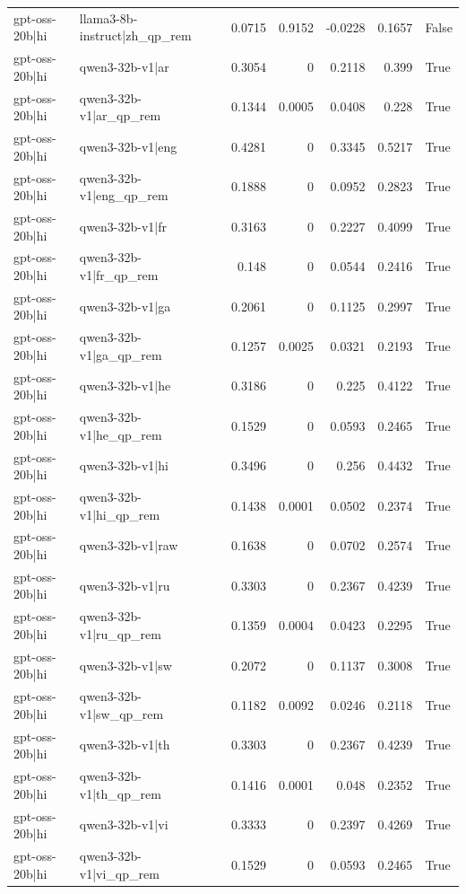 \begin{table}
\begin{tabular}{l l r r r r l}
gpt-oss-20b|hi & llama3-8b-instruct|zh_qp_rem & 0.0715 & 0.9152 & -0.0228 & 0.1657 & False \\
gpt-oss-20b|hi & qwen3-32b-v1|ar & 0.3054 & 0 & 0.2118 & 0.399 & True \\
gpt-oss-20b|hi & qwen3-32b-v1|ar_qp_rem & 0.1344 & 0.0005 & 0.0408 & 0.228 & True \\
gpt-oss-20b|hi & qwen3-32b-v1|eng & 0.4281 & 0 & 0.3345 & 0.5217 & True \\
gpt-oss-20b|hi & qwen3-32b-v1|eng_qp_rem & 0.1888 & 0 & 0.0952 & 0.2823 & True \\
gpt-oss-20b|hi & qwen3-32b-v1|fr & 0.3163 & 0 & 0.2227 & 0.4099 & True \\
gpt-oss-20b|hi & qwen3-32b-v1|fr_qp_rem & 0.148 & 0 & 0.0544 & 0.2416 & True \\
gpt-oss-20b|hi & qwen3-32b-v1|ga & 0.2061 & 0 & 0.1125 & 0.2997 & True \\
gpt-oss-20b|hi & qwen3-32b-v1|ga_qp_rem & 0.1257 & 0.0025 & 0.0321 & 0.2193 & True \\
gpt-oss-20b|hi & qwen3-32b-v1|he & 0.3186 & 0 & 0.225 & 0.4122 & True \\
gpt-oss-20b|hi & qwen3-32b-v1|he_qp_rem & 0.1529 & 0 & 0.0593 & 0.2465 & True \\
gpt-oss-20b|hi & qwen3-32b-v1|hi & 0.3496 & 0 & 0.256 & 0.4432 & True \\
gpt-oss-20b|hi & qwen3-32b-v1|hi_qp_rem & 0.1438 & 0.0001 & 0.0502 & 0.2374 & True \\
gpt-oss-20b|hi & qwen3-32b-v1|raw & 0.1638 & 0 & 0.0702 & 0.2574 & True \\
gpt-oss-20b|hi & qwen3-32b-v1|ru & 0.3303 & 0 & 0.2367 & 0.4239 & True \\
gpt-oss-20b|hi & qwen3-32b-v1|ru_qp_rem & 0.1359 & 0.0004 & 0.0423 & 0.2295 & True \\
gpt-oss-20b|hi & qwen3-32b-v1|sw & 0.2072 & 0 & 0.1137 & 0.3008 & True \\
gpt-oss-20b|hi & qwen3-32b-v1|sw_qp_rem & 0.1182 & 0.0092 & 0.0246 & 0.2118 & True \\
gpt-oss-20b|hi & qwen3-32b-v1|th & 0.3303 & 0 & 0.2367 & 0.4239 & True \\
gpt-oss-20b|hi & qwen3-32b-v1|th_qp_rem & 0.1416 & 0.0001 & 0.048 & 0.2352 & True \\
gpt-oss-20b|hi & qwen3-32b-v1|vi & 0.3333 & 0 & 0.2397 & 0.4269 & True \\
gpt-oss-20b|hi & qwen3-32b-v1|vi_qp_rem & 0.1529 & 0 & 0.0593 & 0.2465 & True \\

\end{tabular}
\end{table}
